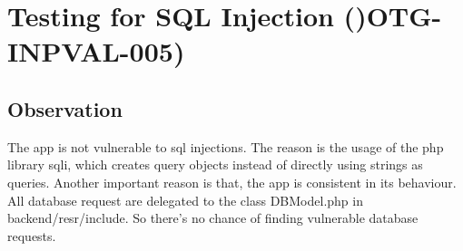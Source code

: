\chapter{Testing for SQL Injection ()OTG-INPVAL-005)}

\section{Observation}

The app is not vulnerable to sql injections.  The reason is the usage of the php library sqli, which creates query objects instead of directly using strings as queries.
 Another important reason is that, the app is consistent in its behaviour. All database request are delegated to the class DBModel.php in backend/resr/include. So there's no chance of finding vulnerable database requests.